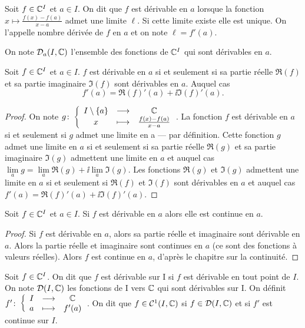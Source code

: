\begin{defdef}
  Soit \(f \in \mathbb{C}^I\) et \(a \in I\). On dit que \(f\) est dérivable en \(a\)
  lorsque la fonction \(x \longmapsto \frac{f(x)-f(a)}{x-a}\) admet une limite
  \(\ell\). Si cette limite existe elle est unique. On l'appelle nombre dérivée
  de \(f\) en \(a\) et on note \(\ell=f'(a)\).

  On note \(\mathcal{D}_{a}(I,\mathbb{C})\) l'ensemble des fonctions de \(\mathbb{C}^I\) qui sont
  dérivables en \(a\).
\end{defdef}
\begin{theo}
  Soit \(f \in \mathbb{C}^I\) et \(a \in I\). \(f\) est dérivable en \(a\) si et
  seulement si sa partie réelle \(\Re(f)\) et sa partie imaginaire \(\Im(f)\)
  sont dérivables en \(a\). Auquel cas
  \begin{equation}
    f'(a) = \Re(f)'(a) + \ii \Im(f)'(a).
  \end{equation}
\end{theo}
\begin{proof}
  On note \(g\colon\left\{\begin{array}{ccc}I\setminus\{a\} & \longrightarrow &\mathbb{C}\\x & \longmapsto & \frac{f(x)-f(a)}{x-a}\end{array}\right.\). La
  fonction \(f\) est dérivable en \(a\) si et seulement si \(g\) admet une
  limite en a --- par définition. Cette fonction \(g\) admet une limite en \(a\)
  si et seulement si sa partie réelle \(\Re(g)\) et sa partie imaginaire
  \(\Im(g)\) admettent une limite en \(a\) et auquel cas \(\lim\limits_{a}g =
  \lim\limits_{a} \Re(g) + \ii \lim\limits_{a} \Im(g)\). Les fonctions
  \(\Re(g)\) et \(\Im(g)\) admettent une limite en \(a\) si et seulement si
  \(\Re(f)\) et \(\Im(f)\) sont dérivables en \(a\) et auquel cas \(f'(a) =
  \Re(f)'(a) + \ii \Im(f)'(a)\).
\end{proof}
\begin{prop}
  Soit \(f \in \mathbb{C}^I\) et \(a \in I\). Si \(f\) est dérivable en \(a\) alors elle
  est continue en \(a\).
\end{prop}
\begin{proof}
  Si \(f\) est dérivable en \(a\), alors sa partie réelle et imaginaire sont
  dérivable en \(a\). Alors la partie réelle et imaginaire sont continues en
  \(a\) (ce sont des fonctions à valeurs réelles). Alors \(f\) est continue en
  \(a\), d'après le chapitre sur la continuité.
\end{proof}
\begin{defdef}
  Soit \(f \in \mathbb{C}^I\). On dit que \(f\) est dérivable sur I si \(f\) est
  dérivable en tout point de \(I\). On note \(\mathcal{D}(I,\mathbb{C})\) les fonctions de I
  vers \(\mathbb{C}\) qui sont dérivables sur I. On définit
  \(f'\colon\left\{\begin{array}{ccc}I & \longrightarrow &\mathbb{C}\\a & \longmapsto & f'(a)\end{array}\right.\). On dit que \(f \in \mathcal{C}^{1}(I,\mathbb{C})\) si
  \(f \in \mathcal{D}(I,\mathbb{C})\) et si \(f'\) est continue sur \(I\).
\end{defdef}

